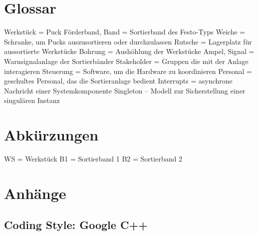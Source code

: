 \documentclass[oneside,a4paper,titlepage]{scrartcl} %
\begin{document}
\newpage

\section{Glossar}
Werkstück = Puck\newline 
Förderband, Band = Sortierband des Festo-Typs\newline
Weiche = Schranke, um Pucks auszusortieren oder durchzulassen\newline
Rutsche = Lagerplatz für aussortierte Werkstücke\newline
Bohrung = Aushöhlung der Werkstücke\newline
Ampel, Signal = Warnsignalanlage der Sortierbänder\newline
Stakeholder = Gruppen die mit der Anlage interagieren\newline
Steuerung = Software, um die Hardware zu koordinieren\newline
Personal = geschultes Personal, das die Sortieranlage bedient\newline
Interrupts = asynchrone Nachricht einer Systemkomponente\newline
Singleton – Modell zur Sicherstellung einer singulären Instanz\newline

\section{Abkürzungen}
WS = Werkstück\newline
B1 = Sortierband 1 \newline
B2 = Sortierband 2 \newline

\section{Anhänge}

\subsection{Coding Style: Google C++}

\end{document}
